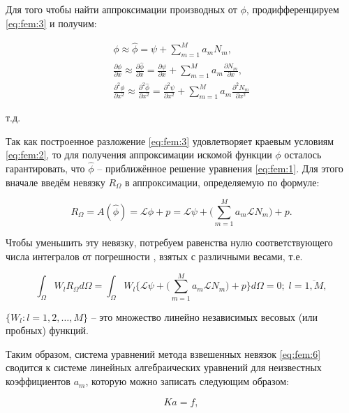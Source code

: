 \documentclass[14pt]{extreport}
\begin{document}
Для того чтобы найти аппроксимации производных от $\phi$, продифференцируем \ref{eq:fem:3} и получим:


\begin{gather}
\phi \approx \hat\phi = \psi + \sum\limits_{m=1}^{M} a_mN_m,\nonumber\\
\frac{\partial \phi}{\partial x} \approx \frac{\partial \hat\phi}{\partial x}=\frac{\partial \psi}{\partial x}+\sum\limits_{m=1}^{M} a_m\frac{\partial N_m}{\partial x},\nonumber\\
\frac{\partial^2 \phi}{\partial x^2} \approx \frac{\partial^2 \hat\phi}{\partial x^2}=\frac{\partial^2 \psi}{\partial x^2}+\sum\limits_{m=1}^{M} a_m\frac{\partial^2 N_m}{\partial x^2} \nonumber
\end{gather}

 т.д.

Так как построенное разложение \ref{eq:fem:3} удовлетворяет краевым условиям \ref{eq:fem:2}, то для получения аппроксимации искомой функции $\phi$ осталось гарантировать, что $\hat\phi$ -- приближённое решение уравнения \ref{eq:fem:1}. Для этого вначале введём невязку $R_\Omega$ в аппроксимации, определяемую по формуле:

\begin{equation}\label{eq:fem:5}
R_\Omega=A(\hat\phi)=\mathcal L \hat\phi+p=\mathcal L\psi+\bigg(\sum\limits_{m=1}^{M} a_m \mathcal L N_m\bigg) +p.
\end{equation}

Чтобы уменьшить эту невязку, потребуем равенства нулю соответствующего числа интегралов от погрешности \cite{bib:calc:zorich}, взятых с различными весами, т.е.

\begin{equation}\label{eq:fem:6}
\int_\Omega W_l R_\Omega d\Omega = \int_\Omega W_l \bigg\{\mathcal L \psi +\bigg(\sum\limits_{m=1}^{M} a_m \mathcal L N_m\bigg) +p \bigg\} d\Omega =0; \; l=\overline{1,M},
\end{equation}

 $\{W_l:l=1,2,\dots,M\}$ -- это множество линейно независимых весовых (или пробных) функций.

Таким образом, система уравнений метода взвешенных невязок \ref{eq:fem:6} сводится к системе линейных алгебраических уравнений для неизвестных коэффициентов $a_m$, которую можно записать следующим образом:

\begin{equation}\label{eq:fem:7}
Ka=f,
\end{equation}
\end{document}
